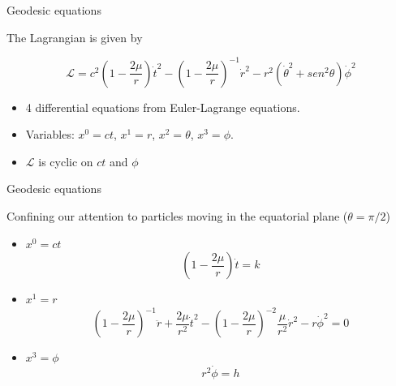 \documentclass[xcolor=dvipsnames]{beamer}
\begin{document}
\begin{frame}{Geodesic equations}

The Lagrangian is given by 

\begin{block}{}
\begin{equation*}
\mathcal{L} = c^{2}\left( 1-\frac{2\mu}{r} \right)\dot{t}^{2}-\left( 1-\frac{2\mu}{r}\right)^{-1}\dot{r}^{2}-r^{2}\left(\dot{\theta}^{2}+sen^{2}\theta\right)\dot{\phi}^{2}
\end{equation*}
\end{block}

\begin{itemize} 
    \item 4 differential equations from Euler-Lagrange equations.
    \item Variables: $x^0 = ct$, $x^1 = r$, $x^2 = \theta$, $x^3 = \phi$.
    \item $\mathcal{L}$ is cyclic on $ct$ and $\phi$
\end{itemize}

\end{frame}


\begin{frame}{Geodesic equations}
    
Confining our attention to particles moving in the equatorial plane ($\theta = \pi/2$)

\begin{itemize}
    \item $x^0 = ct$ 
    \begin{equation*}
        \left( 1 - \frac{2 \mu}{r} \right) \dot{t} = k 
    \end{equation*}
    
    \item $x^1 = r$ 
    \begin{equation*}
        \left( 1 - \frac{2 \mu}{r} \right)^{-1} \ddot{r} + \frac{2\mu}{r^2} \dot{t}^2 - \left( 1 - \frac{2 \mu}{r} \right)^{-2} \frac{\mu}{r^2} \dot{r}^2 - r\dot{\phi}^2  = 0 
    \end{equation*}
    
    \item $x^3 = \phi$ 
    \begin{equation*}
        r^2 \dot{\phi} = h
    \end{equation*}
\end{itemize}

\end{frame}
\end{document}

